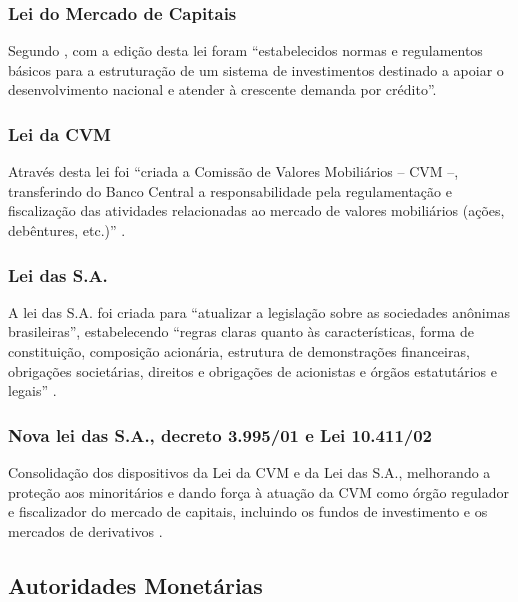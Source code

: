 \documentclass[
	10pt,				%
	openright,			%
	twoside,			%
	a5paper,			%
	english,			%
	french,				%
	spanish,			%
	brazil				%
	]{abntex2}
\begin{document}
\subsubsection{Lei do Mercado de
Capitais}\label{lei-do-mercado-de-capitais}

Segundo , com a edição desta lei foram
``estabelecidos normas e regulamentos básicos para a estruturação de um
sistema de investimentos destinado a apoiar o desenvolvimento nacional e
atender à crescente demanda por crédito''.

\subsubsection{Lei da CVM}\label{lei-da-cvm}

Através desta lei foi ``criada a Comissão de Valores Mobiliários -- CVM
--, transferindo do Banco Central a responsabilidade pela regulamentação
e fiscalização das atividades relacionadas ao mercado de valores
mobiliários (ações, debêntures, etc.)'' \cite[p.16]{fortuna2015}.

\subsubsection{Lei das S.A.}\label{lei-das-s.a.}

A lei das S.A. foi criada para ``atualizar a legislação sobre as
sociedades anônimas brasileiras'', estabelecendo ``regras claras quanto
às características, forma de constituição, composição acionária,
estrutura de demonstrações financeiras, obrigações societárias, direitos
e obrigações de acionistas e órgãos estatutários e legais''
\cite[p.~16]{fortuna2015}.

\subsubsection{Nova lei das S.A., decreto 3.995/01 e Lei
10.411/02}\label{nova-lei-das-s.a.-decreto-3.99501-e-lei-10.41102}

Consolidação dos dispositivos da Lei da CVM e da Lei das S.A.,
melhorando a proteção aos minoritários e dando força à atuação da CVM
como órgão regulador e fiscalizador do mercado de capitais, incluindo os
fundos de investimento e os mercados de derivativos
\cite[p.~14]{beatrizselan}.

\subsection{Autoridades Monetárias}\label{subsec:aut_mon}
\end{document}
